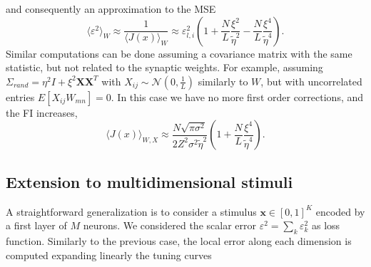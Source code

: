 \documentclass[a4paper]{article}
\begin{document}
and consequently an approximation to the MSE
\begin{equation}
\langle\varepsilon^2\rangle_W  \approx \frac{1}{\langle J(x)\rangle_W} \approx \varepsilon_{l,i}^2 (1+\frac{N}{L}\frac{\xi^2}{\tilde\eta^2}- \frac{N}{L}\frac{\xi^4}{\tilde\eta^4}).
\end{equation}Similar computations can be done assuming a covariance matrix with the same statistic, but not related to the synaptic weights. For example, assuming $\Sigma_{rand} = \eta^2 I + \xi^2 \mathbf{X}\mathbf{X}^T$ with $X_{ij} \sim \mathcal{N}(0,\frac{1}{L})$ similarly to $W$, but with uncorrelated entries $E[X_{ij}W_{mn}] = 0$. In this case we have no more first order corrections, and the FI increases, 
\begin{equation}
\langle J(x)\rangle_{W,X} \approx \frac{N \sqrt{\pi \sigma^2}}{2 Z^2 \sigma^2\tilde\eta^2}(1  + \frac{N}{L}\frac{\xi^4}{\tilde\eta^4}).
\end{equation}


\subsection{Extension to multidimensional stimuli }
A straightforward generalization is to consider a stimulus $\mathbf{x} \in [0,1]^K$ encoded by a first layer of $M$ neurons. We considered the scalar error  $\varepsilon^2 = \sum_k \varepsilon_k^2$  as loss function.  Similarly to the previous case, the local error along each dimension is computed expanding linearly the tuning curves

 
\end{document}
